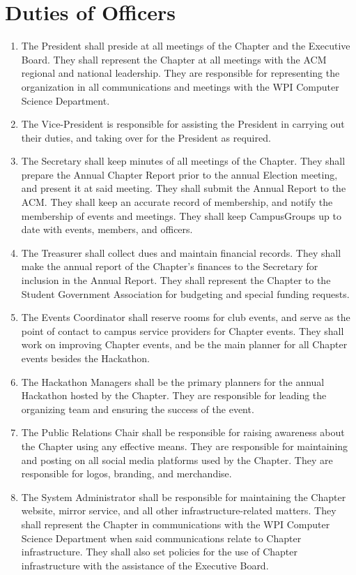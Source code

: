 \documentclass[12pt, letterpaper, oneside]{book}
\begin{document}
\section{Duties of Officers}
\begin{enumerate}
    \item The President shall preside at all meetings of the Chapter
        and the Executive Board. They shall represent the Chapter at all
        meetings with the ACM regional and national leadership. They are
        responsible for representing the organization in all communications and
        meetings with the WPI Computer Science Department.
    \item The Vice-President is responsible for assisting the President in
        carrying out their duties, and taking over for the President as
        required.
    \item The Secretary shall keep minutes of all meetings of the Chapter. They
        shall prepare the Annual Chapter Report prior to the annual Election
        meeting, and present it at said meeting. They shall submit the Annual
        Report to the ACM. They shall keep an accurate record of membership, and
        notify the membership of events and meetings. They shall keep
        CampusGroups up to date with events, members, and officers.
    \item The Treasurer shall collect dues and maintain financial records. They
        shall make the annual report of the Chapter's finances to the Secretary
        for inclusion in the Annual Report. They shall represent the Chapter to
        the Student Government Association for budgeting and special funding
        requests.
    \item The Events Coordinator shall reserve rooms for club events, and serve
        as the point of contact to campus service providers for Chapter events.
        They shall work on improving Chapter events, and be the main planner for
        all Chapter events besides the Hackathon.
    \item The Hackathon Managers shall be the primary planners for the annual
        Hackathon hosted by the Chapter. They are responsible for leading the
        organizing team and ensuring the success of the event.
    \item The Public Relations Chair shall be responsible for raising awareness
        about the Chapter using any effective means. They are responsible for
        maintaining and posting on all social media platforms used by the
        Chapter. They are responsible for logos, branding, and merchandise.
    \item The System Administrator shall be responsible for maintaining the
        Chapter website, mirror service, and all other infrastructure-related
        matters. They shall represent the Chapter in communications with the
        WPI Computer Science Department when said communications relate to
        Chapter infrastructure. They shall also set policies for the use of
        Chapter infrastructure with the assistance of the Executive Board.
\end{enumerate}
\end{document}
